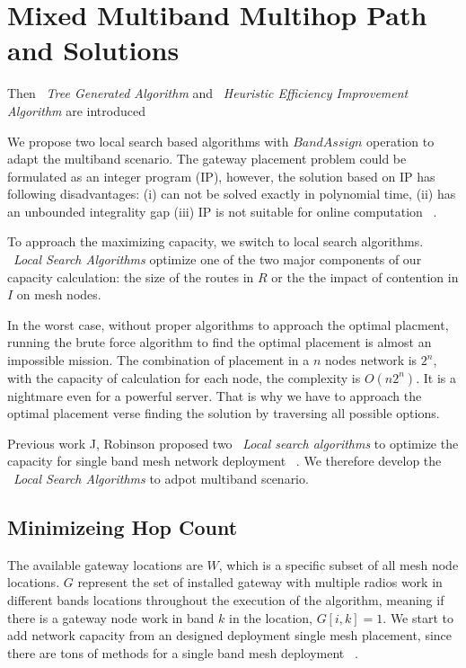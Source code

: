 \section{Mixed Multiband Multihop Path and Solutions}
\label{sec:algorithms}

Then ~\emph{Tree Generated Algorithm} and ~\emph{Heuristic Efficiency Improvement Algorithm} are introduced  

We propose two local search based algorithms with $Band Assign$ operation to adapt the multiband scenario. The gateway placement problem could be formulated as an integer program (IP), however, the solution based on IP has following disadvantages: (i) can not be solved exactly in polynomial time,
   (ii) has an unbounded integrality gap
   (iii) IP is not suitable for online computation ~\cite{robinson2008adding}.

   To approach the maximizing capacity, we switch to local search algorithms.
   ~\emph{Local Search Algorithms} optimize one of the two major components of our capacity calculation: the size of the routes in $R$ or the the impact of contention in $I$ on mesh nodes.

In the worst case, without proper algorithms to approach the optimal placment, running the brute force algorithm to find the optimal placement is almost an impossible mission. The combination of placement in a $n$ nodes network is $2^n$, with the capacity of calculation for each node, the complexity is $O(n2^n)$. It is a nightmare even for a powerful server. That is why we have to approach the optimal placement verse finding the solution by traversing all possible options.

   Previous work J, Robinson proposed two ~\emph{Local search algorithms} to optimize the capacity for single band mesh network deployment ~\cite{robinson2008adding}. 
   We therefore develop the ~\emph{Local Search Algorithms} to adpot multiband scenario.

   \subsection{Minimizeing Hop Count}
   \label{subsec:minhop_intro}

   The available gateway locations are $W$, which is a specific subset of all mesh node locations. $G$ represent the set of installed gateway with multiple radios work in different bands locations throughout the execution of the algorithm, meaning if there is a gateway node work in band $k$ in the location, $G[i,k]=1$.
   We start to add network capacity from an designed deployment single mesh placement, since there are tons of methods for a single band mesh deployment ~\cite{akyildiz2005wireless}.



